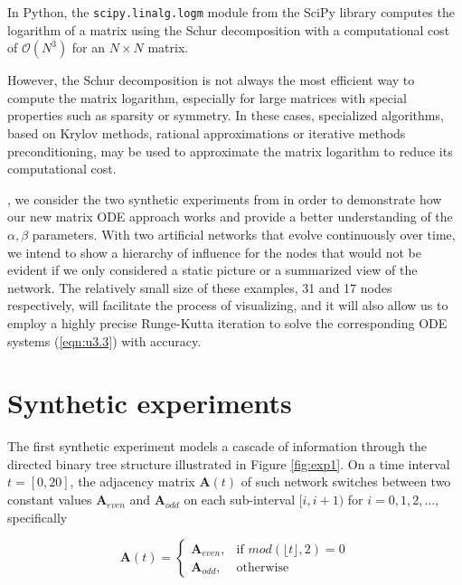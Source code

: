 In Python, the \texttt{scipy.linalg.logm} module from the SciPy library computes the logarithm of a matrix using the Schur decomposition with a computational cost of $\mathcal{O}(N^3)$ for an $N \times N$ matrix. 


However, the Schur decomposition is not always the most efficient way to compute the matrix logarithm, especially for large matrices with special properties such as sparsity or symmetry. In these cases, specialized algorithms, based on Krylov methods, rational approximations or iterative methods  preconditioning, may be used to approximate the matrix logarithm to reduce its computational cost.

, we consider the two synthetic experiments from \cite{grindrod2014dynamical} in order to demonstrate how our new matrix ODE approach works and provide a better understanding of the $\alpha,\beta$ parameters. With  two artificial networks that evolve continuously over time, we intend to show a hierarchy of influence for the nodes that would not be evident if we only considered a static picture or a summarized view of the network. The relatively small size of these examples, 31 and 17 nodes respectively, will facilitate the process of visualizing, and it will also allow us to employ a highly precise Runge-Kutta iteration to solve the corresponding ODE systems (\ref{eqn:u3.3}) with accuracy.

\section{Synthetic experiments}



\label{sec:synexp}
The first synthetic experiment models a cascade of information through the directed binary
tree structure illustrated in Figure \ref{fig:exp1}. On a time interval $t = [0, 20]$, the adjacency
matrix $\mathbf{A}(t)$ of such network switches between two constant values $\mathbf{A}_{even}$ and $\mathbf{A}_{odd}$ on each sub-interval $[i, i + 1)$ for $i=0,1,2,\dots$, specifically

\begin{equation*}
\mathbf{A}(t)=
    \begin{cases}
        \mathbf{A}_{even}, & \text{if } mod(\lfloor t \rfloor, 2) = 0\\
        \mathbf{A}_{odd}, & \text{otherwise} 
    \end{cases}
\end{equation*}

